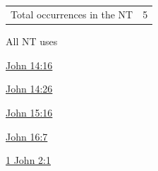 			\subparagraph{\texorpdfstring{}{}}
				\label{PARAKLETOS}
				
				\begin{tabular}{ll}
					Total occurrences in the NT & 5
				\end{tabular}
				
				\begin{compactdesc}
					\item[All NT uses] \phantom{.}
						\begin{compactdesc}
							\item[{\hyperref[JOHN-14-16]{John 14:16}}]
							\item[{\hyperref[JOHN-14-26]{John 14:26}}]
							\item[{\hyperref[JOHN-15-16]{John 15:16}}]
							\item[{\hyperref[JOHN-16-7]{John 16:7}}]
							\item[{\hyperref[1JOHN-2-1]{1 John 2:1}}]
						\end{compactdesc}
				\end{compactdesc}
			
